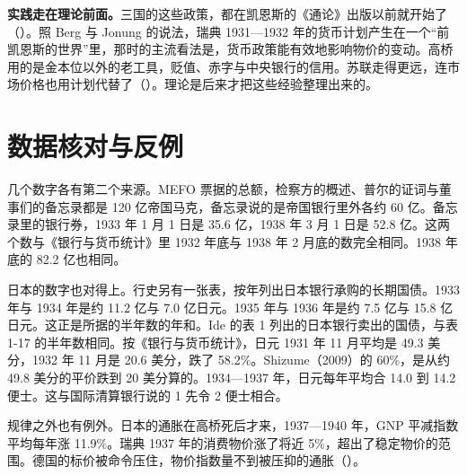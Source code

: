 \textbf{实践走在理论前面。}三国的这些政策，都在凯恩斯的《通论》出版以前就开始了（）。照 Berg 与 Jonung 的说法，瑞典 1931—1932 年的货币计划产生在一个“前凯恩斯的世界”里，那时的主流看法是，货币政策能有效地影响物价的变动\cite{berg1998}。高桥用的是金本位以外的老工具，贬值、赤字与中央银行的信用。苏联走得更远，连市场价格也用计划代替了（）。理论是后来才把这些经验整理出来的。

\section{数据核对与反例}\label{sec:alternatives-check}

几个数字各有第二个来源。MEFO 票据的总额，检察方的概述、普尔的证词与董事们的备忘录都是 120 亿帝国马克，备忘录说的是帝国银行里外各约 60 亿\cite{nca1946b,nca1946g}。备忘录里的银行券，1933 年 1 月 1 日是 35.6 亿，1938 年 3 月 1 日是 52.8 亿\cite{nca1946g}。这两个数与《银行与货币统计》里 1932 年底与 1938 年 2 月底的数完全相同\cite{bms1943}。1938 年底的 82.2 亿也相同\cite{bms1943}。

日本的数字也对得上。行史另有一张表，按年列出日本银行承购的长期国债\cite{boj1984}。1933 年与 1934 年是约 11.2 亿与 7.0 亿日元\cite{boj1984}。1935 年与 1936 年是约 7.5 亿与 15.8 亿日元\cite{boj1984}。这正是所据的半年数的年和。Ide 的表 1 列出的日本银行卖出的国债，与表 1-17 的半年数相同\cite{ide2003,boj1984}。按《银行与货币统计》，日元 1931 年 11 月平均是 49.3 美分，1932 年 11 月是 20.6 美分，跌了 58.2\%\cite{bms1943}。Shizume（2009）的 60\%，是从约 49.8 美分的平价跌到 20 美分算的\cite{shizume2009}。1934—1937 年，日元每年平均合 14.0 到 14.2 便士\cite{bms1943}。这与国际清算银行说的 1 先令 2 便士相合\cite{bis1937}。

规律之外也有例外。日本的通胀在高桥死后才来，1937—1940 年，GNP 平减指数平均每年涨 11.9\%\cite{shizume2009}。瑞典 1937 年的消费物价涨了将近 5\%，超出了稳定物价的范围\cite{berg1998}。德国的标价被命令压住，物价指数量不到被压抑的通胀（）。

